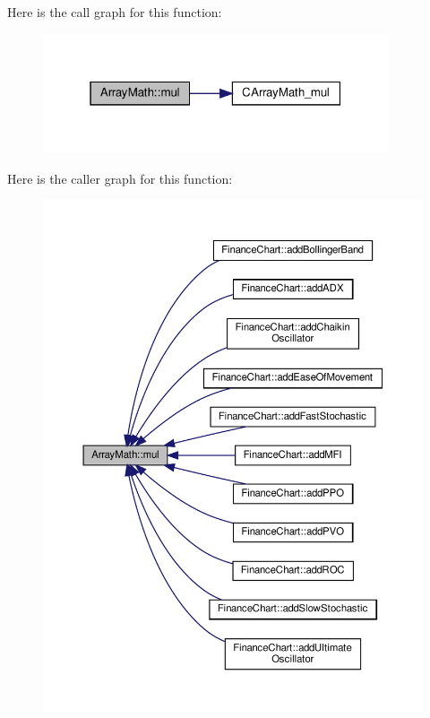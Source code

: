 Here is the call graph for this function\+:
\nopagebreak
\begin{figure}[H]
\begin{center}
\leavevmode
\includegraphics[width=289pt]{class_array_math_a4fb34b6f319e7f3b2a5440d426832889_cgraph}
\end{center}
\end{figure}
Here is the caller graph for this function\+:
\nopagebreak
\begin{figure}[H]
\begin{center}
\leavevmode
\includegraphics[width=350pt]{class_array_math_a4fb34b6f319e7f3b2a5440d426832889_icgraph}
\end{center}
\end{figure}
\mbox{\label{class_array_math_ad44c0c320ef2f9401be5e54d51dc6c73}} 
